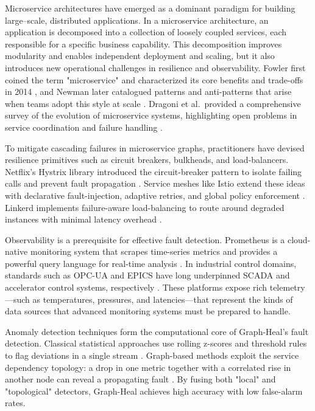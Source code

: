 \documentclass[11pt,conference]{IEEEtran}
\begin{document}
Microservice architectures have emerged as a dominant paradigm for building large–scale, distributed applications.  In a microservice architecture, an application is decomposed into a collection of loosely coupled services, each responsible for a specific business capability.  This decomposition improves modularity and enables independent deployment and scaling, but it also introduces new operational challenges in resilience and observability.  Fowler first coined the term "microservice" and characterized its core benefits and trade-offs in 2014 \cite{Fowler2014}, and Newman later catalogued patterns and anti-patterns that arise when teams adopt this style at scale \cite{Newman2015}.  Dragoni et al.\ provided a comprehensive survey of the evolution of microservice systems, highlighting open problems in service coordination and failure handling \cite{Dragoni2017}.

To mitigate cascading failures in microservice graphs, practitioners have devised resilience primitives such as circuit breakers, bulkheads, and load-balancers.  Netflix's Hystrix library introduced the circuit-breaker pattern to isolate failing calls and prevent fault propagation \cite{DAlessandro2012}.  Service meshes like Istio extend these ideas with declarative fault-injection, adaptive retries, and global policy enforcement \cite{Morgan2017}.  Linkerd implements failure-aware load-balancing to route around degraded instances with minimal latency overhead \cite{Sigelman2016}.

Observability is a prerequisite for effective fault detection.  Prometheus is a cloud-native monitoring system that scrapes time-series metrics and provides a powerful query language for real-time analysis \cite{ReinartzVolz2018}.  In industrial control domains, standards such as OPC-UA and EPICS have long underpinned SCADA and accelerator control systems, respectively \cite{OPCFoundation2015, Dalesio1993}.  These platforms expose rich telemetry—such as temperatures, pressures, and latencies—that represent the kinds of data sources that advanced monitoring systems must be prepared to handle.

Anomaly detection techniques form the computational core of Graph-Heal's fault detection.  Classical statistical approaches use rolling z-scores and threshold rules to flag deviations in a single stream \cite{Chandola2009}.  Graph-based methods exploit the service dependency topology: a drop in one metric together with a correlated rise in another node can reveal a propagating fault \cite{PengWilkes2004}.  By fusing both "local" and "topological" detectors, Graph-Heal achieves high accuracy with low false-alarm rates.
\end{document}
